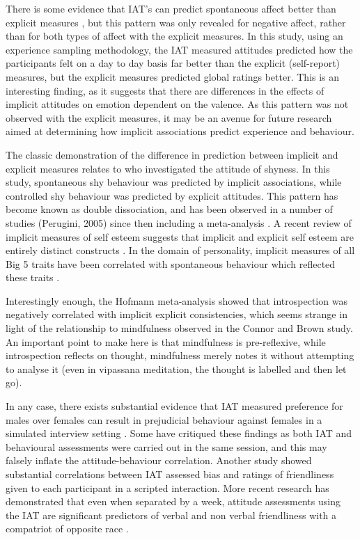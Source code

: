 There is some evidence that IAT's can predict spontaneous affect better than explicit measures \cite{Conner2005} , but this pattern was only revealed for negative affect, rather than for both types of affect with the explicit measures. In this study, using an experience sampling methodology, the IAT measured attitudes predicted how the participants felt on a day to day basis far better than the explicit (self-report) measures, but the explicit measures predicted global ratings better.  This is an interesting finding, as it suggests that there are differences in the effects of implicit attitudes on emotion dependent on the valence. As this pattern was not observed with the explicit measures, it may be an avenue for future research aimed at determining how implicit associations predict experience and behaviour. 

The classic demonstration of the difference in prediction between implicit and explicit measures relates to \cite{Asendorpf2002} who investigated the attitude of shyness. In this study, spontaneous shy behaviour was predicted by implicit associations, while controlled shy behaviour was predicted by explicit attitudes. This pattern has become known as double dissociation, and has been observed in a number of studies (Perugini, 2005) since then including a meta-analysis \cite{Hofmann2005}. A recent review of implicit measures of self esteem suggests that implicit and explicit self esteem are entirely distinct constructs \cite{Rudolph2008} . In the domain of personality, implicit measures of all Big 5 traits have been correlated with spontaneous behaviour which reflected these traits \cite{Steffens2006}.

Interestingly enough, the Hofmann meta-analysis showed that introspection was negatively correlated with implicit explicit consistencies, which seems strange in light of the relationship to mindfulness observed in the Connor and Brown study. An important point to make here is that mindfulness is pre-reflexive, while introspection reflects on thought, mindfulness merely notes it without attempting to analyse it (even in vipassana meditation, the thought is labelled and then let go). 

In any case, there exists substantial evidence that IAT measured preference for males over females  can result in prejudicial behaviour against females in a simulated interview setting \cite{Greenwald2000,Heider2007}. Some have critiqued these findings as both IAT and behavioural assessments were carried out in the same session, and this may falsely inflate the attitude-behaviour correlation. Another study \cite{McConnell2001} showed substantial correlations between IAT assessed bias and ratings of friendliness given to each participant in a scripted interaction. More recent research has demonstrated that even when separated by a week, attitude assessments using the IAT are significant predictors of verbal and non verbal friendliness with a compatriot of opposite race \cite{Heider2007}. 


